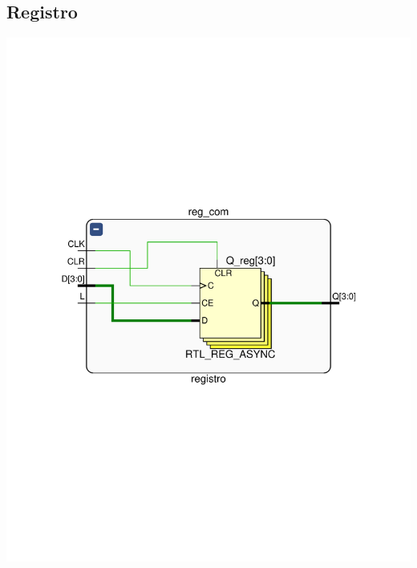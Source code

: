 \documentclass[8pt,executivepaper]{article}
\begin{document}
\subsection{Registro}
\begin{center}
  \includegraphics[scale=0.75]{rtl/registro.pdf}
\end{center}
\end{document}
